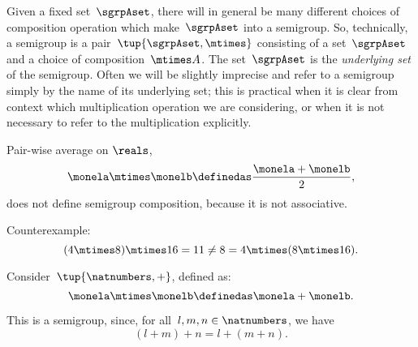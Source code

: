 \begin{remark}
  Given a fixed set~$\sgrpAset$, there will in general be many different choices of composition operation which make~$\sgrpAset$ into a semigroup.
  So, technically, a semigroup is a pair~$\tup{\sgrpAset, \mtimes}$ consisting of a set~$\sgrpAset$ and a choice of composition~$\mtimes A$.
  The set~$\sgrpAset$ is the \emph{underlying set} of the semigroup.
  Often we will be slightly imprecise and refer to a semigroup simply by the name of its underlying set;
  this is practical when it is clear from context which multiplication operation we are considering, or when it is not necessary to refer to the multiplication explicitly.
\end{remark}



\begin{example}
Pair-wise average on $\reals$,
\begin{equation}
    \label{eq:pairwise}
    \monela \mtimes \monelb \definedas  \frac{\monela + \monelb}{2},
\end{equation}
does not define semigroup composition, because it is not associative.

Counterexample:
\begin{equation}\label{eq:pairwise-counterexample}
(4 \mtimes 8) \mtimes 16 = 11 \neq  8 = 4 \mtimes (8 \mtimes 16).
\end{equation}
\end{example}



\begin{example}
  \label{exa:natnum-semigroup}
  Consider~$\tup{\natnumbers,+}$, defined as:
  \begin{equation*}
    \label{eq:natnum-semigroup-definition}
    \monela \mtimes \monelb \definedas  \monela + \monelb.
\end{equation*}

  This is a semigroup, since, for all~$l,m, n \in \natnumbers$, we have
  \begin{equation*}
  (l+m)
    +n
    =l+(m+n).
  \end{equation*}
\end{example}

\begin{comment}

  \begin{equation}
    \label{eq:natnum-product}
    \monela \mtimes \monelb \definedas  \monela \cdot \monelb
\end{equation}
  \begin{equation}
    \label{eq:natnum-min}
    \monela \mtimes \monelb \definedas  \min(\monela, \monelb)
\end{equation}
  \begin{equation}
    \label{eq:natnum-max}
    \monela \mtimes \monelb \definedas  \max(\monela, \monelb)
\end{equation}
\end{comment}

